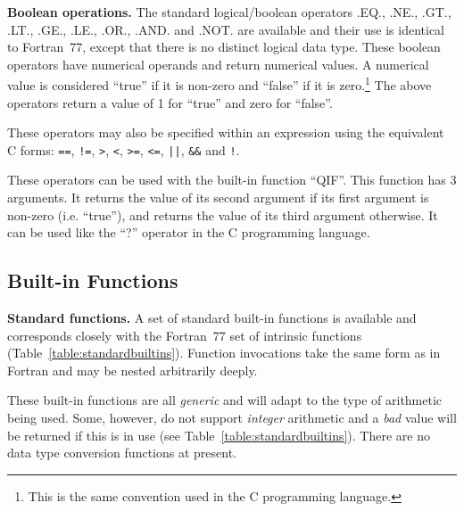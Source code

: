 \documentclass[twoside,nolof,11pt]{starlink}
\begin{document}
\textbf{Boolean operations.}
The standard logical/boolean operators .EQ., .NE., .GT., .LT.,
.GE., .LE., .OR., .AND. and .NOT. are available and their use
is identical to Fortran~77, except that there is no distinct logical data
type. These boolean operators have numerical operands and return numerical
values. A numerical value is considered ``true'' if it is non-zero and
``false'' if it is zero.\footnote{This is the same convention used in
the C programming language.} The above operators return a value of 1 for
``true'' and zero for ``false''.

These operators may also be specified within an expression using the
equivalent C forms:
\verb#==#,
\verb#!=#,
\verb#>#,
\verb#<#,
\verb#>=#,
\verb#<=#,
\verb#||#,
\verb#&&# and
\verb#!#.

These operators can be used with the built-in function ``QIF''. This
function has 3 arguments. It returns the value of its second argument if its
first argument is non-zero (i.e. ``true''), and returns the value of its
third argument otherwise. It can be used like the ``?'' operator in the C
programming language.

\subsection{Built-in Functions}

\textbf{Standard functions.}
A set of standard built-in functions is available and corresponds closely
with the Fortran~77 set of intrinsic functions
(Table~\ref{table:standardbuiltins}).
Function invocations take the same form as in Fortran and may be nested
arbitrarily deeply.

These built-in functions are all \emph{generic} and will adapt to the type of
arithmetic being used.
Some, however, do not support \emph{integer} arithmetic and a \emph{bad} value
will be returned if this is in use (see Table~\ref{table:standardbuiltins}).
There are no data type conversion functions at present.
\end{document}
